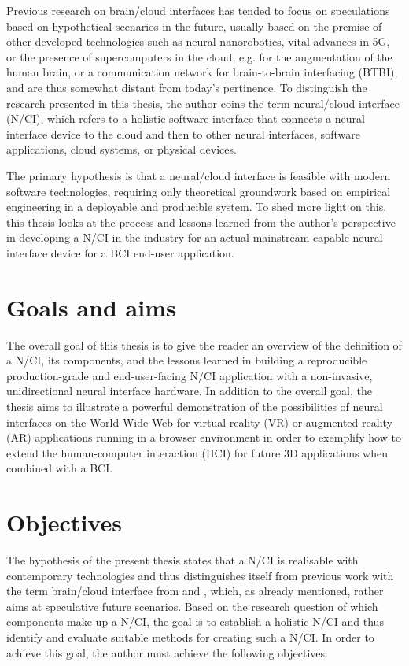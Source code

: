 Previous research on brain/cloud interfaces has tended to focus on speculations based on hypothetical scenarios in the future, usually based on the premise of other developed technologies such as neural nanorobotics, vital advances in 5G, or the presence of supercomputers in the cloud, e.g. for the augmentation of the human brain, or a communication network for brain-to-brain interfacing (BTBI), and are thus somewhat distant from today's pertinence. To distinguish the research presented in this thesis, the author coins the term neural/cloud interface (N/CI), which refers to a holistic software interface that connects a neural interface device to the cloud and then to other neural interfaces, software applications, cloud systems, or physical devices.

The primary hypothesis is that a neural/cloud interface is feasible with modern software technologies, requiring only theoretical groundwork based on empirical engineering in a deployable and producible system. To shed more light on this, this thesis looks at the process and lessons learned from the author's perspective in developing a N/CI in the industry for an actual mainstream-capable neural interface device for a BCI end-user application.

\section{Goals and aims}
\label{chapter1-goals-and-aims}

The overall goal of this thesis is to give the reader an overview of the definition of a N/CI, its components, and the lessons learned in building a reproducible production-grade and end-user-facing N/CI application with a non-invasive, unidirectional neural interface hardware. In addition to the overall goal, the thesis aims to illustrate a powerful demonstration of the possibilities of neural interfaces on the World Wide Web for virtual reality (VR) or augmented reality (AR) applications running in a browser environment in order to exemplify how to extend the human-computer interaction (HCI) for future 3D applications when combined with a BCI.

\section{Objectives}
\label{chapter1-objectives}

The hypothesis of the present thesis states that a N/CI is realisable with contemporary technologies and thus distinguishes itself from previous work with the term brain/cloud interface from \citeauthor{martins_human_2019} and \citeauthor{angelica_cognitive_2021}, which, as already mentioned, rather aims at speculative future scenarios. Based on the research question of which components make up a N/CI, the goal is to establish a holistic N/CI and thus identify and evaluate suitable methods for creating such a N/CI. In order to achieve this goal, the author must achieve the following objectives:

